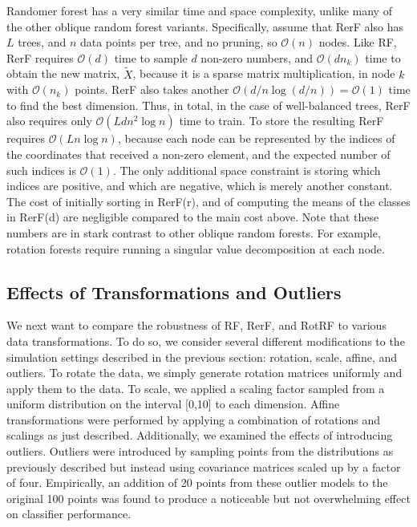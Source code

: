 \documentclass{article}
\providecommand{\mc}[1]{\mathcal{#1}}
\providecommand{\mt}[1]{\widetilde{#1}}
\begin{document}
Randomer forest has a very similar time and space complexity, unlike many of the other oblique random forest variants.  Specifically, assume that RerF also has $L$ trees, and $n$ data points per tree, and no pruning, so $\mc O(n)$ nodes. Like RF, RerF requires $\mc{O}(d)$ time to sample $d$ non-zero numbers, and $\mc{O}(dn_k)$ time to obtain the new matrix, $\mt{X}$, because it is a sparse matrix multiplication, in node $k$ with $\mc O(n_k)$ points.  RerF also takes another $\mc{O}(d/n\log(d/n))=\mc O(1)$ time to find the best dimension. Thus, in total, in the case of well-balanced trees, RerF also requires only $\mc{O}(Ldn^2\log n)$ time to train.  To store the resulting RerF  requires $\mc{O}(L n\log n )$, because each node can be represented by the indices of the coordinates that received a non-zero element, and the expected number of such indices is $\mc O(1)$.  The only additional space constraint is storing which indices are positive, and which are negative, which is merely another constant.
The cost of initially sorting in RerF(r), and of computing the means of the classes in RerF(d) are negligible compared to the main cost above. Note that these numbers are in stark contrast to other oblique random forests.  For example, rotation forests require running a singular value decomposition at each node.

\subsection{Effects of Transformations and Outliers}
\label{section: trans}

We next want to compare the robustness of RF, RerF, and RotRF to various data transformations. To do so, we consider several different modifications to the simulation settings described in the previous section: rotation, scale, affine, and outliers.  To rotate the data, we simply generate rotation matrices uniformly and apply them to the data. To scale, we applied a scaling factor sampled from a uniform distribution on the interval [0,10] to each dimension. Affine transformations were performed by applying a combination of rotations and scalings as just described. Additionally, we examined the effects of introducing outliers. Outliers were introduced by sampling points from the distributions as previously described but instead using covariance matrices scaled up by a factor of four. Empirically, an addition of 20 points from these outlier models to the original 100 points was found to produce a noticeable but not overwhelming effect on classifier performance.
\end{document}
